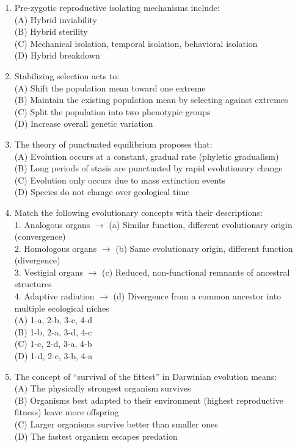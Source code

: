 \documentclass{article}
\begin{document}
\begin{enumerate}[label=Q\arabic*.]
\item Pre-zygotic reproductive isolating mechanisms include:
\\(A) Hybrid inviability
\\(B) Hybrid sterility
\\(C) Mechanical isolation, temporal isolation, behavioral isolation
\\(D) Hybrid breakdown

\item Stabilizing selection acts to:
\\(A) Shift the population mean toward one extreme
\\(B) Maintain the existing population mean by selecting against extremes
\\(C) Split the population into two phenotypic groups
\\(D) Increase overall genetic variation

\item The theory of punctuated equilibrium proposes that:
\\(A) Evolution occurs at a constant, gradual rate (phyletic gradualism)
\\(B) Long periods of stasis are punctuated by rapid evolutionary change
\\(C) Evolution only occurs due to mass extinction events
\\(D) Species do not change over geological time

\item Match the following evolutionary concepts with their descriptions:\\
1. Analogous organs $\rightarrow$ (a) Similar function, different evolutionary origin (convergence)\\
2. Homologous organs $\rightarrow$ (b) Same evolutionary origin, different function (divergence)\\
3. Vestigial organs $\rightarrow$ (c) Reduced, non-functional remnants of ancestral structures\\
4. Adaptive radiation $\rightarrow$ (d) Divergence from a common ancestor into multiple ecological niches
\\(A) 1-a, 2-b, 3-c, 4-d
\\(B) 1-b, 2-a, 3-d, 4-c
\\(C) 1-c, 2-d, 3-a, 4-b
\\(D) 1-d, 2-c, 3-b, 4-a

\item The concept of ``survival of the fittest'' in Darwinian evolution means:
\\(A) The physically strongest organism survives
\\(B) Organisms best adapted to their environment (highest reproductive fitness) leave more offspring
\\(C) Larger organisms survive better than smaller ones
\\(D) The fastest organism escapes predation

\end{enumerate}
\end{document}
